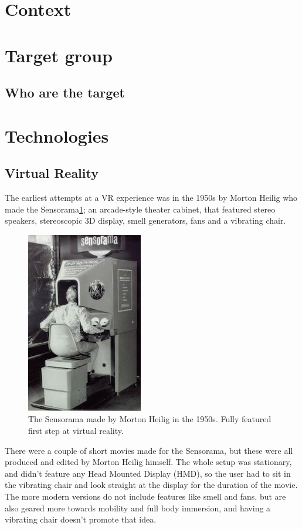 	\section{Context}
		
	\section{Target group}\label{sec:targetGroup}
		\subsection{Who are the target }
		
	\section{Technologies}\label{sec:technologies}
		\subsection{Virtual Reality}
			The earliest attempts at a VR experience was in the 1950s\cite{VRS} by Morton Heilig who made the Sensorama\ref{fig:sensorama}; an arcade-style theater cabinet, that featured stereo speakers, stereoscopic 3D display, smell generators, fans and a vibrating chair.
			\begin{figure}[H]
				\centering
				\includegraphics[width=0.4\linewidth]{figure/Analysis/sensorama2}
				\caption{The Sensorama made by Morton Heilig in the 1950s. Fully featured first step at virtual reality.}
				\label{fig:sensorama}
			\end{figure}
			There were a couple of short movies made for the Sensorama, but these were all produced and edited by Morton Heilig himself. The whole setup was stationary, and didn't feature any Head Mounted Display (HMD), so the user had to sit in the vibrating chair and look straight at the display for the duration of the movie. The more modern versions do not include features like smell and fans, but are also geared more towards mobility and full body immersion, and having a vibrating chair doesn't promote that idea.\\
			
